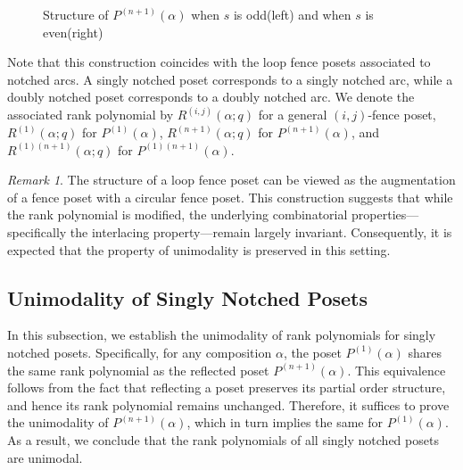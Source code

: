 \documentclass{article}
\theoremstyle{remark}
\newtheorem{remark}{Remark}
\begin{document}
\begin{figure}[H]%
    \centering
{}
    \caption{Structure of \( P^{(n+1)}(\alpha) \) when \( s \) is odd(left) and when \(s\) is even(right)}
    \label{fig:RPFP}
\end{figure}

Note that this construction coincides with the loop fence posets associated to notched arcs. A singly notched poset corresponds to a singly notched arc, while a doubly notched poset corresponds to a doubly notched arc. We denote the associated rank polynomial by \( R^{(i,j)}(\alpha; q) \) for a general \((i,j)\)-fence poset, \( R^{(1)}(\alpha; q) \) for \( P^{(1)}(\alpha) \), \( R^{(n+1)}(\alpha; q) \) for \( P^{(n+1)}(\alpha) \), and \( R^{(1)(n+1)}(\alpha; q) \) for \( P^{(1)(n+1)}(\alpha) \).

\begin{remark}
    The structure of a loop fence poset can be viewed as the augmentation of a fence poset with a circular fence poset. This construction suggests that while the rank polynomial is modified, the underlying combinatorial properties—specifically the interlacing property—remain largely invariant. Consequently, it is expected that the property of unimodality is preserved in this setting.
\end{remark}


\subsection{Unimodality of Singly Notched Posets}

In this subsection, we establish the unimodality of rank polynomials for singly notched posets. Specifically, for any composition \( \alpha \), the poset \( P^{(1)}(\alpha) \) shares the same rank polynomial as the reflected poset \( P^{(n+1)}(\alpha) \). This equivalence follows from the fact that reflecting a poset preserves its partial order structure, and hence its rank polynomial remains unchanged. Therefore, it suffices to prove the unimodality of \( P^{(n+1)}(\alpha) \), which in turn implies the same for \( P^{(1)}(\alpha) \). As a result, we conclude that the rank polynomials of all singly notched posets are unimodal.
\end{document}
